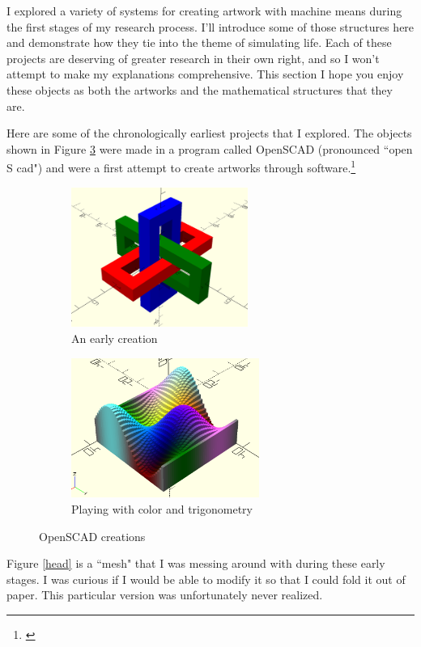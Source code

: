 \documentclass[12pt,twoside]{reedthesis}
\begin{document}
	I explored a variety of systems for creating artwork with machine means during the first stages of my research process. I'll introduce some of those structures here and demonstrate how they tie into the theme of simulating life. Each of these projects are deserving of greater research in their own right, and so I won't attempt to make my explanations comprehensive. This section I hope you enjoy these objects as both the artworks and the mathematical structures that they are.

	Here are some of the chronologically earliest projects that I explored. The objects shown in Figure \ref{OpenSCAD} were made in a program called OpenSCAD (pronounced ``open S cad") and were a first attempt to create artworks through software.\footnote{\cite{openSCAD}}
	
	\begin{figure}[H]
	\centering
	\begin{subfigure}{0.48\linewidth}
		\centering
		\includegraphics[height = 1.8in]{Images/OpenSCAD1}
		\caption{An early creation}
		\label {ThreeHollowRects}
	\end{subfigure}%
	\hfill
	\begin{subfigure}{0.48\linewidth}
		\centering
		\includegraphics[height=1.8in]{Images/OpenSCAD2}
		\caption{Playing with color and trigonometry}
		\label {3dSine}
	\end{subfigure}
	\caption{OpenSCAD creations}
	\label{OpenSCAD}
	\end{figure}
	
	Figure \ref{head} is a ``mesh" that I was messing around with during these early stages. I was curious if I would be able to modify it so that I could fold it out of paper. This particular version was unfortunately never realized.
	
\end{document}
